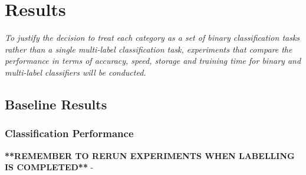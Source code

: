 \documentclass[a4paper,twoside,phd]{BYUPhys}
\begin{document}
\chapter{Results}
\label{chap:Results}

\textit{To justify the decision to treat each category as a set of binary classification tasks rather than a single multi-label classification task, experiments that compare the performance in terms of accuracy, speed, storage and training time for binary and multi-label classifiers will be conducted.}

\section{Baseline Results}
\subsection{Classification Performance}
\textbf{**REMEMBER TO RERUN EXPERIMENTS WHEN LABELLING IS COMPLETED**}
- 
\end{document}
